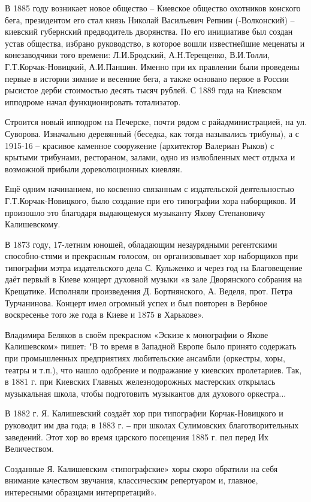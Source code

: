 В 1885 году возникает новое общество – Киевское общество охотников конского
бега, президентом его стал князь Николай Васильевич Репнин (-Волконский) –
киевский губернский предводитель дворянства. По его инициативе был создан устав
общества, избрано руководство, в которое вошли известнейшие меценаты и
конезаводчики того времени: Л.И.Бродский, А.Н.Терещенко, В.И.Толли,
Г.Т.Корчак-Новицкий, А.И.Паншин. Именно при их правлении были проведены первые
в истории зимние и весенние бега, а также основано первое в России рысистое
дерби стоимостью десять тысяч рублей. С 1889 года на Киевском ипподроме начал
функционировать тотализатор.

Строится новый ипподром на Печерске, почти рядом с райадминистрацией, на ул.
Суворова. Изначально деревянный (беседка, как тогда назывались трибуны), а с
1915-16 ‒ красивое каменное сооружение (архитектор Валериан Рыков) с крытыми
трибунами, рестораном, залами, одно из излюбленных мест отдыха и возможной
прибыли дореволюционных киевлян.

Ещё одним начинанием, но косвенно связанным с издательской деятельностью
Г.Т.Корчак-Новицкого, было создание при его типографии хора наборщиков. И
произошло это благодаря выдающемуся музыканту Якову Степановичу Калишевскому. 

В 1873 году, 17-летним юношей, обладающим незаурядными регентскими
способно-стями и прекрасным голосом, он организовывает хор наборщиков при
типографии мэтра издательского дела С. Кульженко и через год на Благовещение
даёт первый в Киеве концерт духовной музыки «в зале Дворянского собрания на
Крещатике. Исполняли произведения Д. Бортнянского, А. Веделя, прот. Петра
Турчанинова. Концерт имел огромный успех и был повторен в Вербное воскресенье
того же года в Киеве и 1875 в Харькове».

Владимира Беляков  в своём прекрасном «Эскизе к монографии о Якове Калишевском»
пишет: "В то время в Западной Европе было принято содержать при промышленных
предприятиях любительские ансамбли (оркестры, хоры, театры и т.п.), что нашло
одобрение и подражание у киевских пролетариев. Так, в 1881 г. при Киевских
Главных железнодорожных мастерских открылась музыкальная школа, чтобы
подготовить музыкантов для духового оркестра...

В 1882 г. Я. Калишевский создаёт хор при типографии Корчак-Новицкого и
руководит им два года; в 1883 г. ‒ при школах Сулимовских благотворительных
заведений. Этот хор во время царского посещения 1885 г. пел перед Их
Величеством.

Созданные Я. Калишевским «типографские» хоры скоро обратили на себя внимание
качеством звучания, классическим репертуаром и, главное, интересными образцами
интерпретаций». 

